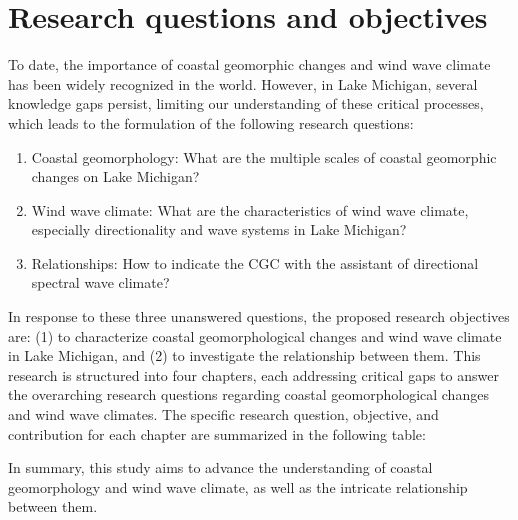 \section{Research questions and objectives}

To date, the importance of coastal geomorphic changes and wind wave climate has been widely recognized in the world. However, in Lake Michigan, several knowledge gaps persist, limiting our understanding of these critical processes, which leads to the formulation of the following research questions:

\begin{enumerate}
    \item Coastal geomorphology: What are the multiple scales of coastal geomorphic changes on Lake Michigan?
    \item Wind wave climate: What are the characteristics of wind wave climate, especially directionality and wave systems in Lake Michigan?
    \item Relationships: How to indicate the CGC with the assistant of directional spectral wave climate?
\end{enumerate}

In response to these three unanswered questions, the proposed research objectives are: (1) to characterize coastal geomorphological changes and wind wave climate in Lake Michigan, and (2) to investigate the relationship between them. This research is structured into four chapters, each addressing critical gaps to answer the overarching research questions regarding coastal geomorphological changes and wind wave climates. The specific research question, objective, and contribution for each chapter are summarized in the following table:



In summary, this study aims to advance the understanding of coastal geomorphology and wind wave climate, as well as the intricate relationship between them.
